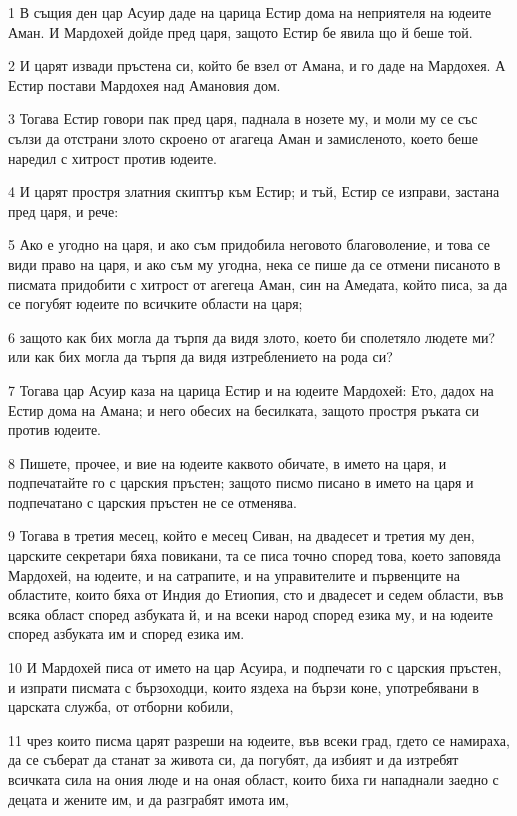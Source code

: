 \par 1 В същия ден цар Асуир даде на царица Естир дома на неприятеля на юдеите Аман. И Мардохей дойде пред царя, защото Естир бе явила що й беше той.
\par 2 И царят извади пръстена си, който бе взел от Амана, и го даде на Мардохея. А Естир постави Мардохея над Амановия дом.
\par 3 Тогава Естир говори пак пред царя, паднала в нозете му, и моли му се със сълзи да отстрани злото скроено от агагеца Аман и замисленото, което беше наредил с хитрост против юдеите.
\par 4 И царят простря златния скиптър към Естир; и тъй, Естир се изправи, застана пред царя, и рече:
\par 5 Ако е угодно на царя, и ако съм придобила неговото благоволение, и това се види право на царя, и ако съм му угодна, нека се пише да се отмени писаното в писмата придобити с хитрост от агегеца Аман, син на Амедата, който писа, за да се погубят юдеите по всичките области на царя;
\par 6 защото как бих могла да търпя да видя злото, което би сполетяло людете ми? или как бих могла да търпя да видя изтреблението на рода си?
\par 7 Тогава цар Асуир каза на царица Естир и на юдеите Мардохей: Ето, дадох на Естир дома на Амана; и него обесих на бесилката, защото простря ръката си против юдеите.
\par 8 Пишете, прочее, и вие на юдеите каквото обичате, в името на царя, и подпечатайте го с царския пръстен; защото писмо писано в името на царя и подпечатано с царския пръстен не се отменява.
\par 9 Тогава в третия месец, който е месец Сиван, на двадесет и третия му ден, царските секретари бяха повикани, та се писа точно според това, което заповяда Мардохей, на юдеите, и на сатрапите, и на управителите и първенците на областите, които бяха от Индия до Етиопия, сто и двадесет и седем области, във всяка област според азбуката й, и на всеки народ според езика му, и на юдеите според азбуката им и според езика им.
\par 10 И Мардохей писа от името на цар Асуира, и подпечати го с царския пръстен, и изпрати писмата с бързоходци, които яздеха на бързи коне, употребявани в царската служба, от отборни кобили,
\par 11 чрез които писма царят разреши на юдеите, във всеки град, гдето се намираха, да се съберат да станат за живота си, да погубят, да избият и да изтребят всичката сила на ония люде и на оная област, които биха ги нападнали заедно с децата и жените им, и да разграбят имота им,
